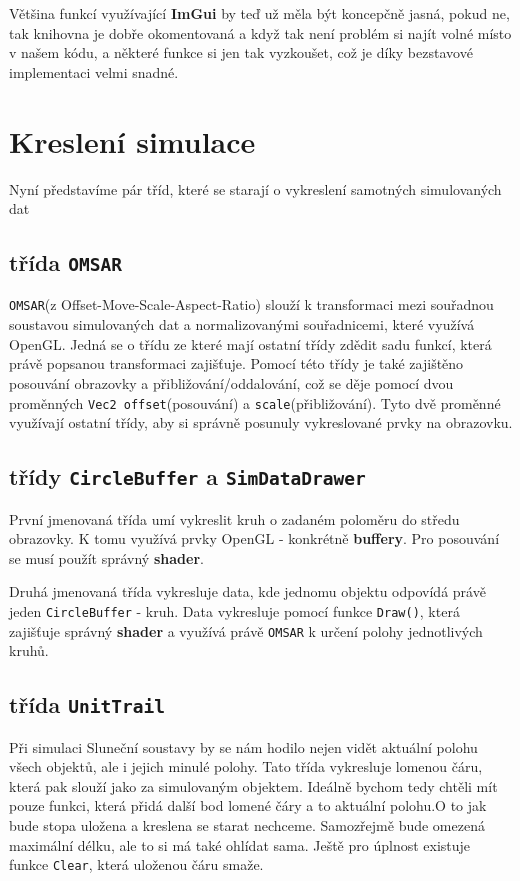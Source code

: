 Většina funkcí využívající \textbf{ImGui} by teď už měla být koncepčně jasná, pokud ne, tak knihovna je dobře okomentovaná a když tak není problém si najít volné místo v našem kódu, a některé funkce si jen tak vyzkoušet, což je díky bezstavové implementaci velmi snadné.
\section{Kreslení simulace}
Nyní představíme pár tříd, které se starají o vykreslení samotných simulovaných dat
\subsection{třída \texttt{OMSAR}}
\texttt{OMSAR}(z Offset-Move-Scale-Aspect-Ratio) slouží k transformaci mezi souřadnou soustavou simulovaných dat a normalizovanými souřadnicemi, které využívá OpenGL. Jedná se o třídu ze které mají ostatní třídy zdědit sadu funkcí, která právě popsanou transformaci zajišťuje. Pomocí této třídy je také zajištěno posouvání obrazovky a přibližování/oddalování, což se děje pomocí dvou proměnných \texttt{Vec2 offset}(posouvání) a \texttt{scale}(přibližování). Tyto dvě proměnné využívají ostatní třídy, aby si správně posunuly vykreslované prvky na obrazovku.
\subsection{třídy \texttt{CircleBuffer} a \texttt{SimDataDrawer}} 
První jmenovaná třída umí vykreslit kruh o zadaném poloměru do středu obrazovky. K tomu využívá prvky OpenGL - konkrétně \textbf{buffery}. Pro posouvání se musí použít správný \textbf{shader}.
 
Druhá jmenovaná třída vykresluje data, kde jednomu objektu odpovídá právě jeden \texttt{CircleBuffer} - kruh. Data vykresluje pomocí funkce \texttt{Draw()}, která zajišťuje správný \textbf{shader} a využívá právě \texttt{OMSAR} k určení polohy jednotlivých kruhů.
\subsection{třída \texttt{UnitTrail}}
\label{sec:unitTrail}
Při simulaci Sluneční soustavy by se nám hodilo nejen vidět aktuální polohu všech objektů, ale i jejich minulé polohy. Tato třída vykresluje lomenou čáru, která pak slouží jako  za simulovaným objektem. Ideálně bychom tedy chtěli mít pouze funkci, která přidá další bod lomené čáry a to aktuální polohu.O to jak bude stopa uložena a kreslena se starat nechceme. Samozřejmě bude omezená maximální délku, ale to si má také ohlídat sama. Ještě pro úplnost existuje funkce \texttt{Clear}, která uloženou čáru smaže.

